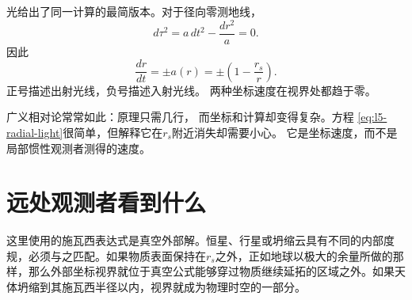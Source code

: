 光给出了同一计算的最简版本。对于径向零测地线，
\begin{equation}
d\tau^2
=a\,dt^2-\frac{dr^2}{a}=0.
\end{equation}
因此
\begin{equation}
\boxed{
\frac{dr}{dt}
=\pm a(r)
=\pm\left(1-\frac{r_s}{r}\right).
}
\label{eq:l5-radial-light}
\end{equation}
正号描述出射光线，负号描述入射光线。
两种坐标速度在视界处都趋于零。

\begin{classroomqa}
\end{classroomqa}

广义相对论常常如此：原理只需几行，
而坐标和计算却变得复杂。方程
\eqref{eq:l5-radial-light}很简单，但解释它在\(r_s\)附近消失却需要小心。
它是坐标速度，而不是局部惯性观测者测得的速度。

\section{远处观测者看到什么}

\begin{classroomqa}
\end{classroomqa}

\begin{classroomqa}
\end{classroomqa}

这里使用的施瓦西表达式是真空外部解。恒星、行星或坍缩云具有不同的内部度规，必须与之匹配。如果物质表面保持在\(r_s\)之外，正如地球以极大的余量所做的那样，那么外部坐标视界就位于真空公式能够穿过物质继续延拓的区域之外。如果天体坍缩到其施瓦西半径以内，视界就成为物理时空的一部分。


